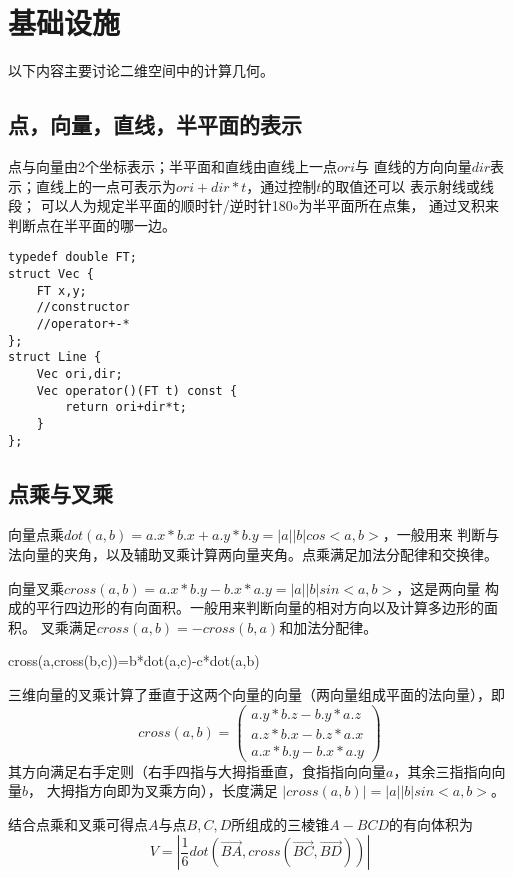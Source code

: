 \section{基础设施}
以下内容主要讨论二维空间中的计算几何。
\subsection{点，向量，直线，半平面的表示}
点与向量由2个坐标表示；半平面和直线由直线上一点$ori$与
直线的方向向量$dir$表示；直线上的一点可表示为$ori+dir*t$，通过控制$t$的取值还可以
表示射线或线段；
可以人为规定半平面的顺时针/逆时针180$\circ$为半平面所在点集，
通过叉积来判断点在半平面的哪一边。
\begin{lstlisting}
typedef double FT;
struct Vec {
    FT x,y;
    //constructor
    //operator+-*
};
struct Line {
    Vec ori,dir;
    Vec operator()(FT t) const {
        return ori+dir*t;
    }
};
\end{lstlisting}
\subsection{点乘与叉乘}
向量点乘$dot(a,b)=a.x*b.x+a.y*b.y=|a||b|cos<a,b>$，一般用来
判断与法向量的夹角，以及辅助叉乘计算两向量夹角。点乘满足加法分配律和交换律。

向量叉乘$cross(a,b)=a.x*b.y-b.x*a.y=|a||b|sin<a,b>$，这是两向量
构成的平行四边形的有向面积。一般用来判断向量的相对方向以及计算多边形的面积。
叉乘满足$cross(a,b)=-cross(b,a)$和加法分配律。

\begin{theorem}[拉格朗日公式]
	cross(a,cross(b,c))=b*dot(a,c)-c*dot(a,b)
\end{theorem}

三维向量的叉乘计算了垂直于这两个向量的向量（两向量组成平面的法向量），即
\begin{displaymath}
	cross(a,b)=\left(\begin{array}{c}
		a.y*b.z-b.y*a.z \\
		a.z*b.x-b.z*a.x \\
		a.x*b.y-b.x*a.y
	\end{array}\right)
\end{displaymath}
其方向满足右手定则（右手四指与大拇指垂直，食指指向向量$a$，其余三指指向向量$b$，
大拇指方向即为叉乘方向），长度满足
$|cross(a,b)|=|a||b|sin<a,b>$。

结合点乘和叉乘可得点$A$与点$B,C,D$所组成的三棱锥$A-BCD$的有向体积为
\begin{displaymath}
	V=|\frac{1}{6}dot(\overrightarrow{BA},cross(\overrightarrow{BC},
	\overrightarrow{BD}))|
\end{displaymath}
